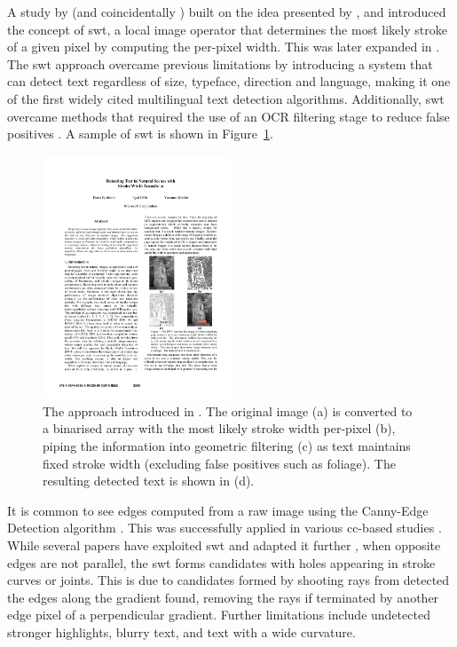 A study by \citet{Epshtein:2010tj} (and coincidentally \citet{Zhang:2011cl}) built on the idea presented by \citeauthor{Subramanian:2007tf}, and introduced the concept of \gls{swt}, a local image operator that determines the most likely stroke of a given pixel by computing the per-pixel width. This was later expanded in \citet{Srivastav:2008ge}. The \gls{swt} approach overcame previous limitations by introducing a system that can detect text regardless of size, typeface, direction and language, making it one of the first widely cited multilingual text detection algorithms. Additionally, \gls{swt} overcame methods that required the use of an OCR filtering stage to reduce false positives \citep{Chen:2004tx, XiangrongChen:2004ha, Ye:2005wu}. A sample of \gls{swt} is shown in Figure~\ref{fig:background:detection:cc:epshtein2010_swt}.

\begin{figure}[h]
  \centering
  \includegraphics[width=0.5\textwidth]{images/background/epshtein2010_swt}
  \caption[Stroke Width Transformation from \citet{Epshtein:2010tj}]{The  approach introduced in \citep{Epshtein:2010tj}. The original image (a) is converted to a binarised array with the most likely stroke width per-pixel (b), piping the information into geometric filtering (c) as text maintains fixed stroke width (excluding false positives such as foliage). The resulting detected text is shown in (d).}
  \label{fig:background:detection:cc:epshtein2010_swt}
\end{figure}

It is common to see edges computed from a raw image using the Canny-Edge Detection algorithm \citep{Canny:1986uw}. This was successfully applied in various \gls{cc}-based studies \citep{Epshtein:2010tj, Chen:2011ul, Zhang:2010wa}. While several papers have exploited \gls{swt} and adapted it further \cite{Shivakumara:2011dn, Zhang:2011cl}, when opposite edges are not parallel, the \gls{swt} forms candidates with holes appearing in stroke curves or joints. This is due to candidates formed by shooting rays from detected the edges along the gradient found, removing the rays if terminated by another edge pixel of a perpendicular gradient. Further limitations include undetected stronger highlights, blurry text, and text with a wide curvature.

